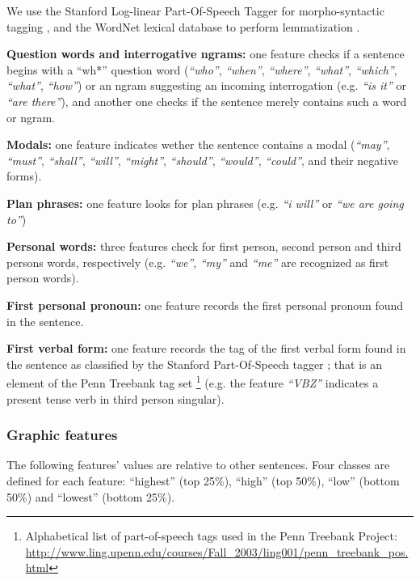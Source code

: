 We use the Stanford Log-linear Part-Of-Speech Tagger for morpho-syntactic tagging \cite{toutanova2003feature}, and the WordNet lexical database to perform lemmatization \cite{miller1995wordnet}.

\textbf{Question words and interrogative ngrams:} one feature checks if a sentence begins with a ``wh*'' question word  (\textit{``who''}, \textit{``when''}, \textit{``where''}, \textit{``what''}, \textit{``which''}, \textit{``what''}, \textit{``how''}) or an ngram suggesting an incoming interrogation (e.g. \textit{``is it''} or \textit{``are there''}), and another one checks if the sentence merely contains such a word or ngram.

\textbf{Modals:} one feature indicates wether the sentence contains a modal (\textit{``may''}, \textit{``must''}, \textit{``shall''}, \textit{``will''}, \textit{``might''}, \textit{``should''}, \textit{``would''}, \textit{``could''}, and their negative forms).

\textbf{Plan phrases:} one feature looks for plan phrases (e.g. \textit{``i will''} or \textit{``we are going to''})

\textbf{Personal words:} three features check for first person, second person and third persons words, respectively (e.g. \textit{``we''}, \textit{``my''} and \textit{``me''} are recognized as first person words).

\textbf{First personal pronoun:} one feature records the first personal pronoun found in the sentence.

\textbf{First verbal form:} one feature records the tag of the first verbal form found in the sentence as classified by the Stanford Part-Of-Speech tagger ; that is an element of the Penn Treebank tag set \footnote{Alphabetical list of part-of-speech tags used in the Penn Treebank Project: \url{http://www.ling.upenn.edu/courses/Fall_2003/ling001/penn_treebank_pos.html}} (e.g. the feature \textit{``VBZ''} indicates a present tense verb in third person singular).

\subsubsection{Graphic features}

The following features' values are relative to other sentences. Four classes are defined for each feature: ``highest'' (top 25\%), ``high'' (top 50\%), ``low'' (bottom 50\%) and ``lowest'' (bottom 25\%).\newline

